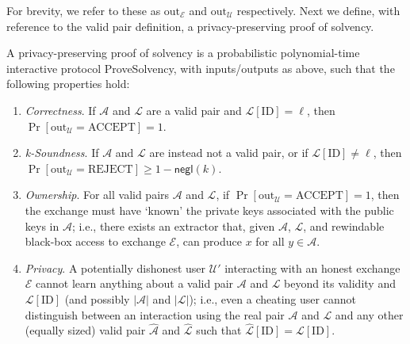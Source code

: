 For brevity, we refer to these as $\text{out}_{\mathcal{E}}$ and $\text{out}_{\mathcal{U}}$ respectively. Next we define, with reference to the valid pair definition, a privacy-preserving proof of solvency.


\begin{definition}
\label{def:2}

A privacy-preserving proof of solvency is a probabilistic polynomial-time interactive protocol ProveSolvency, with inputs/outputs as above, such that the following properties hold:

\begin{enumerate}
\item \textit{Correctness}. If $\mathcal{A}$ and $\mathcal{L}$ are a valid pair and $\mathcal{L}[\text{ID}] = \ell$, then $\Pr[\text{out}_{\mathcal{U}} = \text{ACCEPT}] = 1$.
\item \textit{k-Soundness}. If $\mathcal{A}$ and $\mathcal{L}$ are instead not a valid pair, or if $\mathcal{L}[\text{ID}] \neq \ell$, then $\Pr[\text{out}_{\mathcal{U}} = \text{REJECT}] \geq 1 - \mathsf{negl}(k)$.
\item \textit{Ownership}. For all valid pairs $\mathcal{A}$ and $\mathcal{L}$, if $\Pr[\text{out}_{\mathcal{U}} = \text{ACCEPT}] = 1$, then the exchange must have ‘known’ the private keys associated with the public keys in $\mathcal{A}$; i.e., there exists an extractor that, given $\mathcal{A}$, $\mathcal{L}$, and rewindable black-box access to exchange $\mathcal{E}$, can produce $x$ for all $y \in \mathcal{A}$.
\item \textit{Privacy}. A potentially dishonest user $\mathcal{U}'$ interacting with an honest exchange $\mathcal{E}$ cannot learn anything about a valid pair $\mathcal{A}$ and $\mathcal{L}$ beyond its validity and $\mathcal{L}[\text{ID}]$ (and possibly $|\mathcal{A}|$ and $|\mathcal{L}|$); i.e., even a cheating user cannot distinguish between an interaction using the real pair $\mathcal{A}$ and $\mathcal{L}$ and any other (equally sized) valid pair $\hat{\mathcal{A}}$ and $\hat{\mathcal{L}}$ such that $\hat{\mathcal{L}}[\text{ID}] = \mathcal{L}[\text{ID}]$.
\end{enumerate}
\end{definition}
